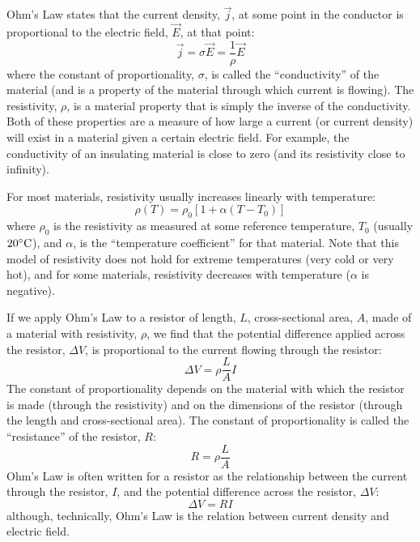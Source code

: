 Ohm's Law states that the current density, $\vec j$, at some point in the conductor is proportional to the electric field, $\vec E$, at that point:
\begin{equation}
\vec j=\sigma \vec E=\frac{1}{\rho}\vec E
\end{equation}
where the constant of proportionality, $\sigma$, is called the ``conductivity'' of the material (and is a property of the material through which current is flowing). The resistivity, $\rho$, is a material property that is simply the inverse of the conductivity. Both of these properties are a measure of how large a current (or current density) will exist in a material given a certain electric field. For example, the conductivity of an insulating material is close to zero (and its resistivity close to infinity).

For most materials, resistivity usually increases linearly with temperature:
\begin{equation}
\rho(T)=\rho_0[1+\alpha(T-T_0)]
\end{equation}
where $\rho_0$ is the resistivity as measured at some reference temperature, $T_0$ (usually $20 {\rm \degree C}$), and $\alpha$, is the ``temperature coefficient'' for that material. Note that this model of resistivity does not hold for extreme temperatures (very cold or very hot), and for some materials, resistivity decreases with temperature ($\alpha$ is negative).

If we apply Ohm's Law to a resistor of length, $L$, cross-sectional area, $A$, made of a material with resistivity, $\rho$, we find that the potential difference applied across the resistor, $\Delta V$, is proportional to the current flowing through the resistor:
\begin{equation}
\Delta V =\rho \frac{L}{A} I
\end{equation}
The constant of proportionality depends on the material with which the resistor is made (through the resistivity) and on the dimensions of the resistor (through the length and cross-sectional area). The constant of proportionality is called the ``resistance'' of the resistor, $R$:
\begin{equation}
R=\rho \frac{L}{A}
\end{equation}
Ohm's Law is often written for a resistor as the relationship between the current through the resistor, $I$, and the potential difference across the resistor, $\Delta V$:
\begin{equation}
\Delta V = RI
\end{equation}
although, technically, Ohm's Law is the relation between current density and electric field.

